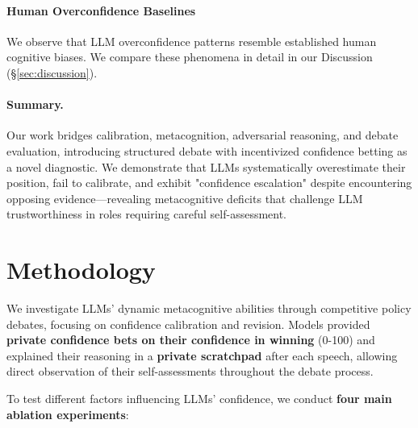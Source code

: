 \documentclass{article}
\begin{document}
\paragraph{Human Overconfidence Baselines}
We observe that LLM overconfidence patterns resemble established human cognitive biases. We compare these phenomena in detail in our Discussion (\S\ref{sec:discussion}).

\paragraph{Summary.}
Our work bridges calibration, metacognition, adversarial reasoning, and debate evaluation, introducing structured debate with incentivized confidence betting as a novel diagnostic. We demonstrate that LLMs systematically overestimate their position, fail to calibrate, and exhibit "confidence escalation" despite encountering opposing evidence—revealing metacognitive deficits that challenge LLM trustworthiness in roles requiring careful self-assessment.

\section{Methodology}
\label{sec:methodology}

We investigate LLMs' dynamic metacognitive abilities through competitive policy debates, focusing on confidence calibration and revision. Models provided \textbf{private confidence bets on their confidence in winning} (0-100) and explained their reasoning in a \textbf{private scratchpad} after each speech, allowing direct observation of their self-assessments throughout the debate process.

To test different factors influencing LLMs' confidence, we conduct \textbf{four main ablation experiments}:
\end{document}
